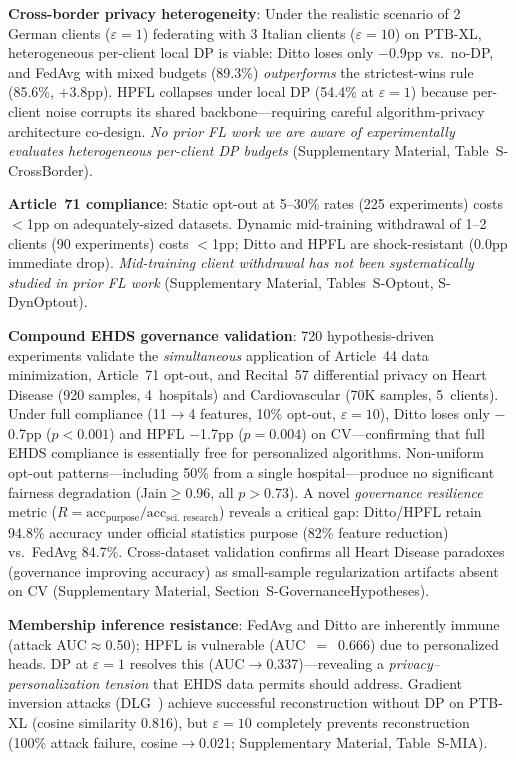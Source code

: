 \documentclass[conference]{IEEEtran}
\begin{document}
\textbf{Cross-border privacy heterogeneity}: Under the realistic scenario of 2 German clients ($\varepsilon{=}1$) federating with 3 Italian clients ($\varepsilon{=}10$) on PTB-XL, heterogeneous per-client local DP is viable: Ditto loses only $-$0.9pp vs.\ no-DP, and FedAvg with mixed budgets (89.3\%) \textit{outperforms} the strictest-wins rule (85.6\%, $+$3.8pp). HPFL collapses under local DP (54.4\% at $\varepsilon{=}1$) because per-client noise corrupts its shared backbone---requiring careful algorithm-privacy architecture co-design. \textit{No prior FL work we are aware of experimentally evaluates heterogeneous per-client DP budgets} (Supplementary Material, Table~S-CrossBorder).

\textbf{Article~71 compliance}: Static opt-out at 5--30\% rates (225 experiments) costs $<$1pp on adequately-sized datasets. Dynamic mid-training withdrawal of 1--2 clients (90 experiments) costs $<$1pp; Ditto and HPFL are shock-resistant (0.0pp immediate drop). \textit{Mid-training client withdrawal has not been systematically studied in prior FL work} (Supplementary Material, Tables~S-Optout, S-DynOptout).

\textbf{Compound EHDS governance validation}: 720 hypothesis-driven experiments validate the \textit{simultaneous} application of Article~44 data minimization, Article~71 opt-out, and Recital~57 differential privacy on Heart Disease (920 samples, 4~hospitals) and Cardiovascular (70K samples, 5~clients). Under full compliance (11$\to$4 features, 10\% opt-out, $\varepsilon{=}10$), Ditto loses only $-$0.7pp ($p{<}0.001$) and HPFL $-$1.7pp ($p{=}0.004$) on CV---confirming that full EHDS compliance is essentially free for personalized algorithms. Non-uniform opt-out patterns---including 50\% from a single hospital---produce no significant fairness degradation (Jain$\geq$0.96, all $p{>}0.73$). A novel \textit{governance resilience} metric ($R = \text{acc}_{\text{purpose}} / \text{acc}_{\text{sci.\ research}}$) reveals a critical gap: Ditto/HPFL retain 94.8\% accuracy under official statistics purpose (82\% feature reduction) vs.\ FedAvg 84.7\%. Cross-dataset validation confirms all Heart Disease paradoxes (governance improving accuracy) as small-sample regularization artifacts absent on CV (Supplementary Material, Section~S-GovernanceHypotheses).

\textbf{Membership inference resistance}: FedAvg and Ditto are inherently immune (attack AUC$\approx$0.50); HPFL is vulnerable (AUC~$=$~0.666) due to personalized heads. DP at $\varepsilon{=}1$ resolves this (AUC$\to$0.337)---revealing a \textit{privacy--personalization tension} that EHDS data permits should address. Gradient inversion attacks (DLG~\cite{zhu2019deep}) achieve successful reconstruction without DP on PTB-XL (cosine similarity 0.816), but $\varepsilon{=}10$ completely prevents reconstruction (100\% attack failure, cosine$\to$0.021; Supplementary Material, Table~S-MIA).
\end{document}
